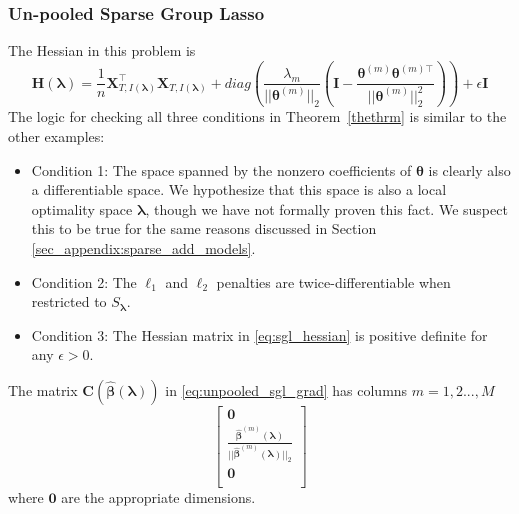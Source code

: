 \documentclass[12pt,letterpaper]{article}
\begin{document}
\subsubsection{Un-pooled Sparse Group Lasso}
The Hessian in this problem is
\begin{equation}
\boldsymbol{H}(\boldsymbol\lambda) =
\frac{1}{n} \boldsymbol X_{T, I(\boldsymbol \lambda)}^\top \boldsymbol X_{T, I(\boldsymbol \lambda)}
+ diag\left(
\frac{\lambda_m}{|| \boldsymbol \theta^{(m)}||_2}
\left (
\boldsymbol I - 
\frac{\boldsymbol \theta^{(m)} \boldsymbol \theta^{(m) \top}}{|| \boldsymbol \theta^{(m)}||_2^2}
\right )
\right)
+ \epsilon \boldsymbol I
\label{eq:sgl_hessian}
\end{equation}
The logic for checking all three conditions in Theorem~\ref{thethrm} is similar to the other examples:
\begin{itemize}
	\item[] Condition 1: The space spanned by the nonzero coefficients of $\boldsymbol{\theta}$ is clearly also a differentiable space. We hypothesize that this space is also a local optimality space $\boldsymbol{\lambda}$, though we have not formally proven this fact. We suspect this to be true for the same reasons discussed in Section \ref{sec_appendix:sparse_add_models}.
	\item[] Condition 2: The $\ell_1$ and $\ell_2$ penalties are twice-differentiable when restricted to $S_{\boldsymbol{\lambda}}$.\hfill {}
	\item[] Condition 3: The Hessian matrix in \eqref{eq:sgl_hessian} is positive definite for any $\epsilon > 0$. \hfill {}
\end{itemize}


The matrix $\boldsymbol C(\hat {\boldsymbol \beta}(\boldsymbol \lambda))$ in \eqref{eq:unpooled_sgl_grad} has columns $m=1,2...,M$ 
\begin{equation}
\begin{bmatrix}
\boldsymbol 0\\
\frac{\hat {\boldsymbol \beta}^{(m)}(\boldsymbol \lambda)}{||\hat{\boldsymbol \beta}^{(m)}(\boldsymbol \lambda)||_2}\\
\boldsymbol 0\\
\end{bmatrix}
\end{equation}
where $\boldsymbol 0$ are the appropriate dimensions.
\end{document}
